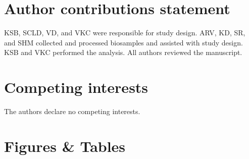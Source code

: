 \documentclass[fleqn,10pt]{wlscirep}
\begin{document}
\section*{Author contributions statement}


KSB, SCLD, VD, and VKC were responsible for study design.
ARV, KD, SR, and SHM collected and processed biosamples and assisted with study design.
KSB and VKC performed the analysis.
All authors reviewed the manuscript.

\section*{Competing interests}

The authors declare no competing interests.

\section*{Figures \& Tables}







\end{document}
